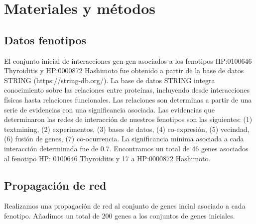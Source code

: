 \section{Materiales y métodos}
\subsection*{Datos fenotipos}
El conjunto inicial de interacciones gen-gen asociados a los fenotipos HP:0100646 Thyroiditis y HP:0000872 Hashimoto fue obtenido a partir de la base de datos STRING (https://string-db.org/). La base de datos STRING  integra conocimiento sobre las relaciones entre proteínas, incluyendo desde interacciones físicas hasta relaciones funcionales. Las relaciones son determinas a partir de una serie de evidencias con una significancia asociada. \cite{Szklarczyk2021}  Las evidencias que determinaron las redes de interacción de nuestros fenotipos son las siguientes: (1) textmining, (2) experimentos, (3) bases de datos, (4) co-expresión, (5) vecindad, (6) fusión de genes, (7) co-ocurrencia. La significancia mínima asociada a cada interacción determinada fue de 0.7. Encontramos un total de 46 genes asociados al fenotipo  HP: 0100646 Thyroiditis y 17 a  HP:0000872 Hashimoto. 
\subsection*{Propagación de red}
Realizamos una propagación de red al conjunto de genes incial asociado a cada fenotipo. Añadimos un total de 200 genes a los conjuntos de genes iniciales.
